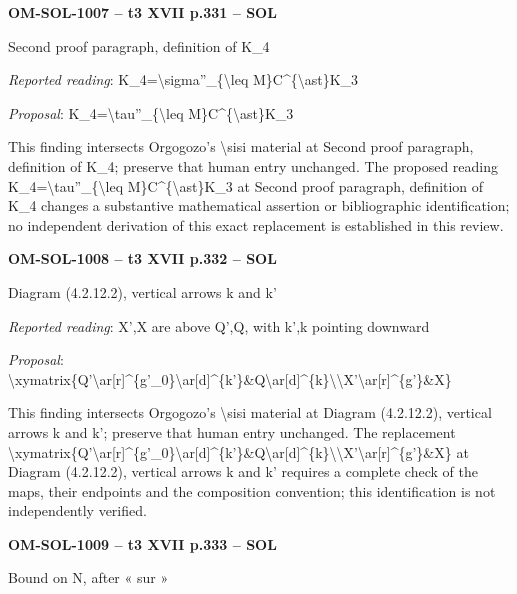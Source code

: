 \par\noindent\textbf{OM-SOL-1007 -- t3 XVII p.331 -- SOL}\par
Second proof paragraph, definition of K\_4\par
\emph{Reported reading}: K\_4=\allowbreak \textbackslash{}sigma''\_\{\textbackslash{}leq M\}C\textasciicircum{}\{\textbackslash{}ast\}K\_3\par
\emph{Proposal}: K\_4=\allowbreak \textbackslash{}tau''\_\{\textbackslash{}leq M\}C\textasciicircum{}\{\textbackslash{}ast\}K\_3\par
This finding intersects Orgogozo's \textbackslash{}sisi material at Second proof paragraph, definition of K\_4; preserve that human entry unchanged. The proposed reading K\_4=\allowbreak \textbackslash{}tau''\_\{\textbackslash{}leq M\}C\textasciicircum{}\{\textbackslash{}ast\}K\_3 at Second proof paragraph, definition of K\_4 changes a substantive mathematical assertion or bibliographic identification; no independent derivation of this exact replacement is established in this review.\par
\par\noindent\textbf{OM-SOL-1008 -- t3 XVII p.332 -- SOL}\par
Diagram (4.2.12.2), vertical arrows k and k'\par
\emph{Reported reading}: X',X are above Q',Q, with k',k pointing downward\par
\emph{Proposal}: \textbackslash{}xymatrix\{Q'\textbackslash{}ar[r]\textasciicircum{}\{g'\_0\}\textbackslash{}ar[d]\textasciicircum{}\{k'\}\&Q\textbackslash{}ar[d]\textasciicircum{}\{k\}\textbackslash{}\textbackslash{}X'\textbackslash{}ar[r]\textasciicircum{}\{g'\}\&X\}\par
This finding intersects Orgogozo's \textbackslash{}sisi material at Diagram (4.2.12.2), vertical arrows k and k'; preserve that human entry unchanged. The replacement \textbackslash{}xymatrix\{Q'\textbackslash{}ar[r]\textasciicircum{}\{g'\_0\}\textbackslash{}ar[d]\textasciicircum{}\{k'\}\&Q\textbackslash{}ar[d]\textasciicircum{}\{k\}\textbackslash{}\textbackslash{}X'\textbackslash{}ar[r]\textasciicircum{}\{g'\}\&X\} at Diagram (4.2.12.2), vertical arrows k and k' requires a complete check of the maps, their endpoints and the composition convention; this identification is not independently verified.\par
\par\noindent\textbf{OM-SOL-1009 -- t3 XVII p.333 -- SOL}\par
Bound on N, after « sur »\par
